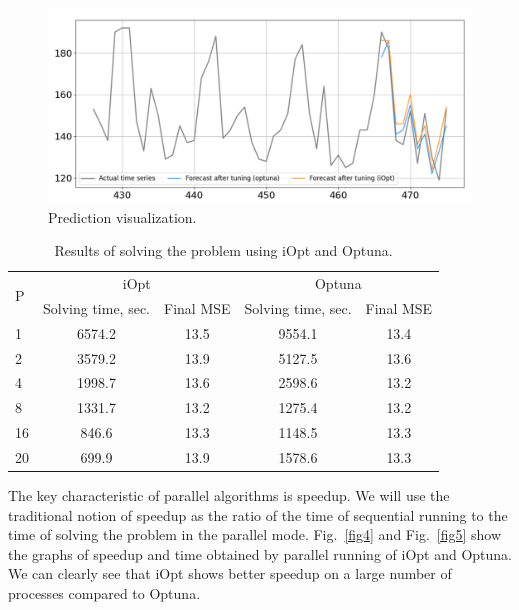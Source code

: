 \documentclass[runningheads]{llncs}
\begin{document}
%
%
%
%
%
%

\begin{figure}
\center
\includegraphics[width=1\textwidth]{fig3.png}
\caption{Prediction visualization.} \label{fig3}
\end{figure}
%
%
%
%
%
%
\begin{table}
\centering
\caption{Results of solving the problem using iOpt and Optuna.}\label{tab1}
\begin{tabular}{|l|c|c|c|c|}
\hline
\multirow{2}{*}{P} & \multicolumn{2}{c|}{iOpt} & \multicolumn{2}{c|}{Optuna} \\
\cline{2-5} 
 & Solving time, sec. & Final MSE & Solving time, sec. & Final MSE \\
\hline
1 & 6574.2 & 13.5 & 9554.1 & 13.4 \\
2 & 3579.2 & 13.9 & 5127.5 & 13.6 \\
4 & 1998.7 & 13.6 & 2598.6 & 13.2 \\
8 & 1331.7 & 13.2 & 1275.4 & 13.2 \\
16 & 846.6 & 13.3 & 1148.5 & 13.3 \\
20 & 699.9 & 13.9 & 1578.6 & 13.3 \\
\hline
\end{tabular}
\end{table}

The key characteristic of parallel algorithms is speedup. We will use the traditional notion of speedup as the ratio of the time of sequential running to the time of solving the problem in the parallel mode. Fig.~\ref{fig4} and Fig.~\ref{fig5} show the graphs of speedup and time obtained by parallel running of iOpt and Optuna. We can clearly see that iOpt shows better speedup on a large number of processes compared to Optuna.
\end{document}
